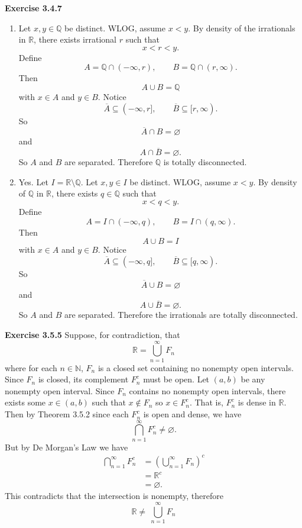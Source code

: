 \documentclass[12pt]{article}
\begin{document}
\textbf{Exercise 3.4.7}
\begin{enumerate}[label=(\alph*)]
    \item Let \( x,y \in \mathbb{Q} \) be distinct. WLOG, assume \( x < y  \). By density of the irrationals in \( \mathbb{R} \), there exists irrational \( r \) such that
          \[
              x < r < y.
          \]
          Define
          \[
              A = \mathbb{Q} \cap (-\infty  , r), \qquad  B = \mathbb{Q} \cap (r, \infty  ).
          \]
          Then
          \[
              A \cup B = \mathbb{Q}
          \]
          with \( x \in A \) and \( y \in B \). Notice
          \[
              \overline{A} \subseteq (-\infty, r], \qquad \overline{B} \subseteq [r, \infty ).
          \]
          So
          \[
              \overline{A} \cap B = \varnothing
          \]
          and
          \[
              A \cap \overline{B} = \varnothing .
          \]
          So \( A \) and \( B \) are separated.
          Therefore \( \mathbb{Q} \) is totally disconnected.


    \item Yes. Let \( I = \mathbb{R} \setminus \mathbb{Q} \). Let \( x,y \in I \) be distinct. WLOG, assume \( x < y \). By density of \( \mathbb{Q} \) in \( \mathbb{R} \), there exists \( q \in \mathbb{Q} \) such that
          \[
              x < q < y.
          \]
          Define
          \[
              A = I \cap (-\infty,q), \qquad B = I \cap (q, \infty ).
          \]
          Then
          \[
              A \cup B = I
          \]
          with \( x \in A \) and \( y \in B \). Notice
          \[
              \overline{A} \subseteq (-\infty, q], \qquad \overline{B} \subseteq [q, \infty ).
          \]
          So
          \[
              \overline{A} \cup  B = \varnothing
          \]
          and
          \[
              A \cup \overline{B} = \varnothing .
          \]
          So \( A \) and \( B \) are separated.
          Therefore the irrationals are totally disconnected.

\end{enumerate}

\textbf{Exercise 3.5.5}
Suppose, for contradiction, that
\[
    \mathbb{R} = \bigcup_{n=1}^{\infty} F_n
\]
where for each \( n \in  \mathbb{N} \), \( F_n \) is a closed set containing no nonempty open intervals.
Since \( F_n \) is closed, its complement \( F_n^c \) must be open.
Let \( (a,b) \) be any nonempty open interval. Since \( F_n \) contains no nonempty open intervals, there exists some \( x \in (a,b) \) such that \( x \not \in F_n \) so \( x \in F_n^c \). That is, \( F_n^c \) is dense in \( \mathbb{R} \). Then by Theorem 3.5.2 since each \( F_n^c \) is open and dense, we have
\[
    \bigcap_{n=1}^{\infty} F_n^c \neq \varnothing .
\]
But by De Morgan's Law we have
\[
    \begin{split}
        \bigcap_{n=1}^{\infty} F_n^c
         & = \left(\bigcup_{n=1}^{\infty} F_n\right)^c \\
         & = \mathbb{R}^c                              \\
         & = \varnothing.
    \end{split}
\]
This contradicts that the intersection is nonempty, therefore
\[
    \mathbb{R} \neq\ \bigcup_{n=1}^{\infty} F_n
\]
\end{document}
